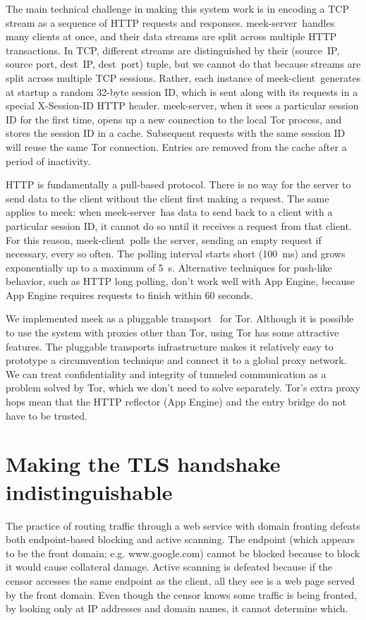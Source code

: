 \documentclass{article}
\def\meekclient{\mbox{meek-client}}
\def\meekserver{\mbox{meek-server}}
\begin{document}
The main technical challenge in making this system work
is in encoding a TCP stream as a sequence of HTTP requests and responses.
\meekserver\ handles many clients at once, and their data streams
are split across multiple HTTP transactions.
In TCP, different streams are distinguished by their
(source~IP, source port, dest~IP, dest~port) tuple,
but we cannot do that because streams are split across multiple TCP sessions.
Rather, each instance of \meekclient\ generates at startup a random 32-byte
session ID, which is sent along with its requests in a special
X-Session-ID HTTP header.
\meekserver, when it sees a particular session ID for the first time,
opens up a new connection to the local Tor process,
and stores the session ID in a cache. Subsequent requests with the
same session ID will reuse the same Tor connection.
Entries are removed from the cache after a period of inactivity.

HTTP is fundamentally a pull-based protocol.
There is no way for the server to send data to the client without
the client first making a request.
The same applies to meek: when \meekserver\ has data to send back to
a client with a particular session ID, it cannot do so until it
receives a request from that client.
For this reason, \meekclient\ polls the server,
sending an empty request if necessary, every so often.
The polling interval starts short (100~ms) and grows exponentially
up to a maximum of 5~s.
Alternative techniques for push-like behavior,
such as HTTP long polling,
don't work well with App Engine,
because App Engine requires requests to finish within 60 seconds.

We implemented meek as a pluggable transport~\cite{pt} for Tor.
Although it is possible to use the system with proxies other than Tor,
using Tor has some attractive features.
The pluggable transports infrastructure makes it relatively easy to prototype
a circumvention technique and connect it to a global proxy network.
We can treat confidentiality and integrity of tunneled communication
as a problem solved by Tor, which we don't need to solve separately.
Tor's extra proxy hops mean that the HTTP reflector (App Engine)
and the entry bridge do not have to be trusted.

\section{Making the TLS handshake indistinguishable}
\label{sec:browserextension}

The practice of routing traffic through a web service with domain fronting
defeats both endpoint-based blocking and active scanning.
The endpoint (which appears to be the front domain; e.g. www.google.com)
cannot be blocked because to block it would cause collateral damage.
Active scanning is defeated because if the censor accesses the same
endpoint as the client, all they see is a web page served by the front domain.
Even though the censor knows some traffic is being fronted,
by looking only at IP addresses and domain names, it cannot determine which.
\end{document}
